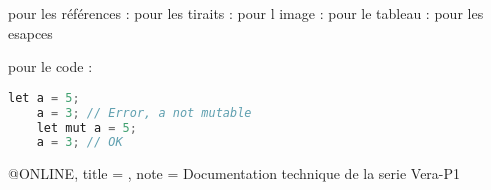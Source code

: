 pour les références : \cite{rust_site}
pour les tiraits : 
pour l image : 
pour le tableau :
pour les esapces 

\bigskip
\pagebreak


pour le code : 
\begin{lstlisting}[autogobble, language=Go, style=boxed]
    let a = 5;
    a = 3; // Error, a not mutable
    let mut a = 5;
    a = 3; // OK
\end{lstlisting}



@ONLINE{,
title = {\href{}{}},
note = {Documentation technique de la serie Vera-P1}
}